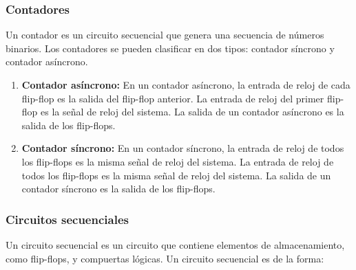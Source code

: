 \subsubsection{Contadores}
Un contador es un circuito secuencial que genera una secuencia de números binarios. Los contadores se pueden clasificar en dos tipos: contador síncrono y contador asíncrono.

\begin{enumerate}
    \item \textbf{Contador asíncrono:} En un contador asíncrono, la entrada de reloj de cada flip-flop es la salida del flip-flop anterior. La entrada de reloj del primer flip-flop es la señal de reloj del sistema. La salida de un contador asíncrono es la salida de los flip-flops.
    \item \textbf{Contador síncrono:} En un contador síncrono, la entrada de reloj de todos los flip-flops es la misma señal de reloj del sistema. La entrada de reloj de todos los flip-flops es la misma señal de reloj del sistema. La salida de un contador síncrono es la salida de los flip-flops.
\end{enumerate}

\subsubsection{Circuitos secuenciales}
Un circuito secuencial es un circuito que contiene elementos de almacenamiento, como flip-flops, y compuertas lógicas. Un circuito secuencial es de la forma:

